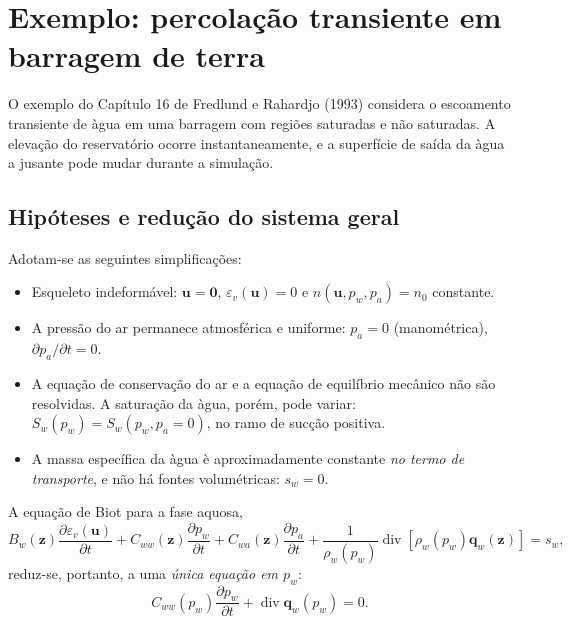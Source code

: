 \documentclass[11pt,a4paper]{article}
\newcommand{\Div}{\operatorname{div}}
\begin{document}
\section{Exemplo: percola\c{c}\~ao transiente em barragem de terra}\label{sec:barragem}

O exemplo do Cap\'itulo 16 de Fredlund e Rahardjo (1993) considera
o escoamento transiente de \`agua em uma barragem com regi\~oes
saturadas e n\~ao saturadas. A eleva\c{c}\~ao do reservat\'orio ocorre
instantaneamente, e a superf\'icie de sa\'ida da \`agua a jusante
pode mudar durante a simula\c{c}\~ao.

\subsection{Hip\'oteses e redu\c{c}\~ao do sistema geral}

Adotam-se as seguintes simplifica\c{c}\~oes:
\begin{itemize}
\item Esqueleto indeform\'avel:
$\mathbf u=\mathbf0$, $\varepsilon_v(\mathbf u)=0$ e
$n(\mathbf u,p_w,p_a)=n_0$ constante.
\item A press\~ao do ar permanece atmosf\'erica e uniforme:
$p_a=0$ (manom\'etrica), $\partial p_a/\partial t=0$.
\item A equa\c{c}\~ao de conserva\c{c}\~ao do ar e a equa\c{c}\~ao de
equil\'ibrio mec\^anico n\~ao s\~ao resolvidas. A satura\c{c}\~ao da
\`agua, por\'em, pode variar:
$S_w(p_w)=S_w(p_w,p_a=0)$, no ramo de suc\c{c}\~ao positiva.
\item A massa espec\'ifica da \`agua \`e aproximadamente constante
\emph{no termo de transporte}, e n\~ao h\'a fontes volum\'etricas:
$s_w=0$.
\end{itemize}

A equa\c{c}\~ao de Biot para a fase aquosa,
\begin{equation*}
B_w(\mathbf z)\frac{\partial\varepsilon_v(\mathbf u)}{\partial t}
+C_{ww}(\mathbf z)\frac{\partial p_w}{\partial t}
+C_{wa}(\mathbf z)\frac{\partial p_a}{\partial t}
+\frac{1}{\rho_w(p_w)}\Div[\rho_w(p_w)\mathbf q_w(\mathbf z)]=s_w,
\end{equation*}
reduz-se, portanto, a uma \emph{\'unica equa\c{c}\~ao em $p_w$}:
\begin{equation*}
\boxed{C_{ww}(p_w)\frac{\partial p_w}{\partial t}
+\Div\mathbf q_w(p_w)=0.}
\end{equation*}
\end{document}
